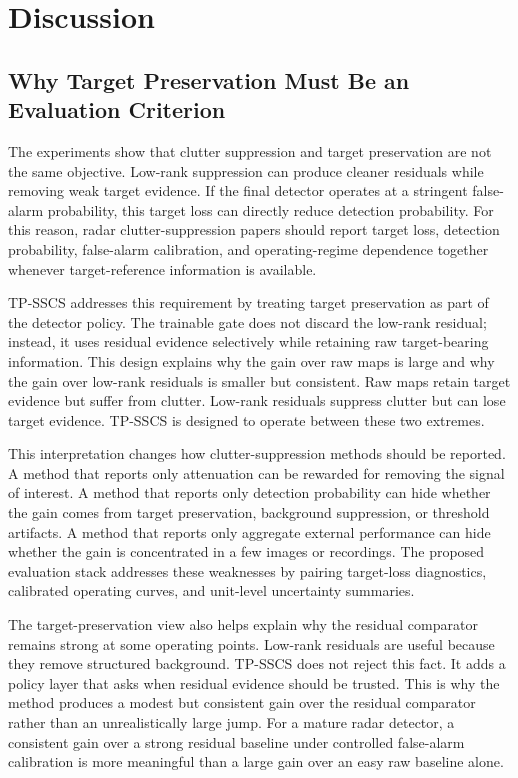 \documentclass[journal]{IEEEtran}
\begin{document}
\section{Discussion}

\subsection{Why Target Preservation Must Be an Evaluation Criterion}

The experiments show that clutter suppression and target preservation are not the same objective. Low-rank suppression can produce cleaner residuals while removing weak target evidence. If the final detector operates at a stringent false-alarm probability, this target loss can directly reduce detection probability. For this reason, radar clutter-suppression papers should report target loss, detection probability, false-alarm calibration, and operating-regime dependence together whenever target-reference information is available.

TP-SSCS addresses this requirement by treating target preservation as part of the detector policy. The trainable gate does not discard the low-rank residual; instead, it uses residual evidence selectively while retaining raw target-bearing information. This design explains why the gain over raw maps is large and why the gain over low-rank residuals is smaller but consistent. Raw maps retain target evidence but suffer from clutter. Low-rank residuals suppress clutter but can lose target evidence. TP-SSCS is designed to operate between these two extremes.

This interpretation changes how clutter-suppression methods should be reported. A method that reports only attenuation can be rewarded for removing the signal of interest. A method that reports only detection probability can hide whether the gain comes from target preservation, background suppression, or threshold artifacts. A method that reports only aggregate external performance can hide whether the gain is concentrated in a few images or recordings. The proposed evaluation stack addresses these weaknesses by pairing target-loss diagnostics, calibrated operating curves, and unit-level uncertainty summaries.

The target-preservation view also helps explain why the residual comparator remains strong at some operating points. Low-rank residuals are useful because they remove structured background. TP-SSCS does not reject this fact. It adds a policy layer that asks when residual evidence should be trusted. This is why the method produces a modest but consistent gain over the residual comparator rather than an unrealistically large jump. For a mature radar detector, a consistent gain over a strong residual baseline under controlled false-alarm calibration is more meaningful than a large gain over an easy raw baseline alone.
\end{document}
